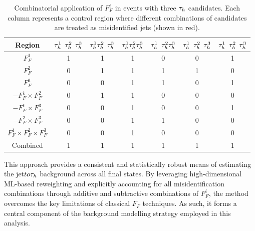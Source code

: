 \begin{table}[!htbp]
\centering
\renewcommand{\arraystretch}{1.5} %
\setlength{\tabcolsep}{10pt} %
\begin{tabular}{ccccccc}
\hline
Region & \textcolor{red}{$\tau_h^1$} $\tau_h^2$ $\tau_h^3$ & \textcolor{red}{$\tau_h^1 \tau_h^2$} $\tau_h^3$ & \textcolor{red}{$\tau_h^1 \tau_h^2 \tau_h^3$} & $\tau_h^1$ \textcolor{red}{$\tau_h^2 \tau_h^3$} & $\tau_h^1$ \textcolor{red}{$\tau_h^2$} $\tau_h^3$ & \textcolor{red}{$\tau_h^1$} $\tau_h^2$ \textcolor{red}{$\tau_h^3$} \\ \hline

$F_F^1$ & 1 & 1 & 1 & 0 & 0 & 1 \\
\arrayrulecolor{lightgray} \hline

$F_F^2$ & 0 & 1 & 1 & 1 & 1 & 0 \\
\arrayrulecolor{lightgray} \hline

$F_F^3$ & 0 & 0 & 1 & 1 & 0 & 1 \\
\arrayrulecolor{lightgray} \hline

$-F_F^1 \times F_F^2$ & 0 & 1 & 1 & 0 & 0 & 0 \\
\arrayrulecolor{lightgray} \hline

$-F_F^1 \times F_F^3$ & 0 & 0 & 1 & 0 & 0 & 1 \\
\arrayrulecolor{lightgray} \hline

$-F_F^2 \times F_F^3$ & 0 & 0 & 1 & 1 & 0 & 0 \\
\arrayrulecolor{lightgray} \hline

$F_F^1 \times F_F^2 \times F_F^3$ & 0 & 0 & 1 & 0 & 0 & 0 \\
\arrayrulecolor{black} \hline

Combined & 1 & 1 & 1 & 1 & 1 & 1 \\
\end{tabular}
\caption[Combinatorial application of Fake Factors for three $\PGt_h$ candidates.]{
Combinatorial application of $F_F^i$ in events with three $\PGt_h$ candidates. Each column represents a control region where different combinations of candidates are treated as misidentified jets (shown in red).}
\label{Table:Chapter_6_FFApplication_3Taus}
\end{table}

This approach provides a consistent and statistically robust means of estimating the jet$to\tau_h$ background across all final states. By leveraging high-dimensional \ac{ML}-based reweighting and explicitly accounting for all misidentification combinations through additive and subtractive combinations of $F_F^i$, the method overcomes the key limitations of classical $F_F$ techniques. As such, it forms a central component of the background modelling strategy employed in this analysis.

